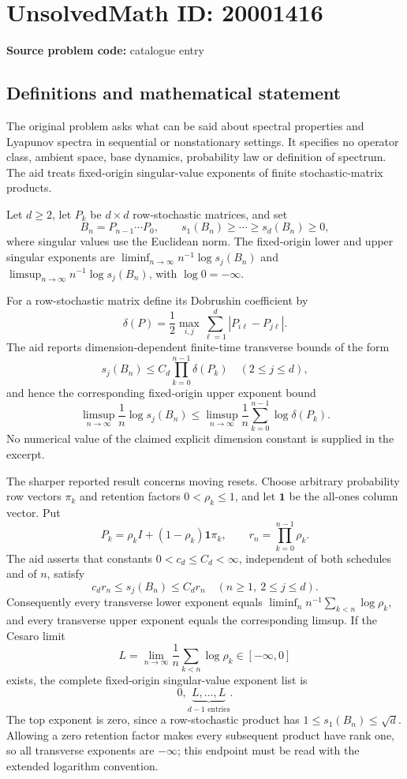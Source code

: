 \documentclass[11pt]{article}
\begin{document}
\section*{UnsolvedMath ID: 20001416}
\textbf{Source problem code:} catalogue entry
\subsection{Definitions and mathematical statement}
The original problem asks what can be said about spectral properties and Lyapunov spectra in sequential or nonstationary settings. It specifies no operator class, ambient space, base dynamics, probability law or definition of spectrum. The aid treats fixed-origin singular-value exponents of finite stochastic-matrix products.

Let \(d\geq2\), let \(P_k\) be \(d\times d\) row-stochastic matrices, and set
\[
 B_n=P_{n-1}\cdots P_0,\qquad
 s_1(B_n)\geq\cdots\geq s_d(B_n)\geq0,
\]
where singular values use the Euclidean norm. The fixed-origin lower and upper singular exponents are \(\liminf_{n\to\infty}n^{-1}\log s_j(B_n)\) and \(\limsup_{n\to\infty}n^{-1}\log s_j(B_n)\), with \(\log0=-\infty\).

For a row-stochastic matrix define its Dobrushin coefficient by
\[
 \delta(P)=\frac12\max_{i,j}\sum_{\ell=1}^d|P_{i\ell}-P_{j\ell}|.
\]
The aid reports dimension-dependent finite-time transverse bounds of the form
\[
 s_j(B_n)\leq C_d\prod_{k=0}^{n-1}\delta(P_k)\quad(2\leq j\leq d),
\]
and hence the corresponding fixed-origin upper exponent bound
\[
 \limsup_{n\to\infty}\frac1n\log s_j(B_n)
 \leq\limsup_{n\to\infty}\frac1n\sum_{k=0}^{n-1}\log\delta(P_k).
\]
No numerical value of the claimed explicit dimension constant is supplied in the excerpt.

The sharper reported result concerns moving resets. Choose arbitrary probability row vectors \(\pi_k\) and retention factors \(0<\rho_k\leq1\), and let \(\mathbf1\) be the all-ones column vector. Put
\[
 P_k=\rho_k I+(1-\rho_k)\mathbf1\pi_k,
 \qquad r_n=\prod_{k=0}^{n-1}\rho_k.
\]
The aid asserts that constants \(0<c_d\leq C_d<\infty\), independent of both schedules and of \(n\), satisfy
\[
 c_dr_n\leq s_j(B_n)\leq C_dr_n
 \quad(n\geq1,\ 2\leq j\leq d).
\]
Consequently every transverse lower exponent equals
\(\liminf_n n^{-1}\sum_{k<n}\log\rho_k\), and every transverse upper exponent equals the corresponding limsup. If the Cesaro limit
\[
 L=\lim_{n\to\infty}\frac1n\sum_{k<n}\log\rho_k\in[-\infty,0]
\]
exists, the complete fixed-origin singular-value exponent list is
\[
 0,\underbrace{L,\ldots,L}_{d-1\text{ entries}}.
\]
The top exponent is zero, since a row-stochastic product has \(1\leq s_1(B_n)\leq\sqrt d\). Allowing a zero retention factor makes every subsequent product have rank one, so all transverse exponents are \(-\infty\); this endpoint must be read with the extended logarithm convention.
\end{document}
